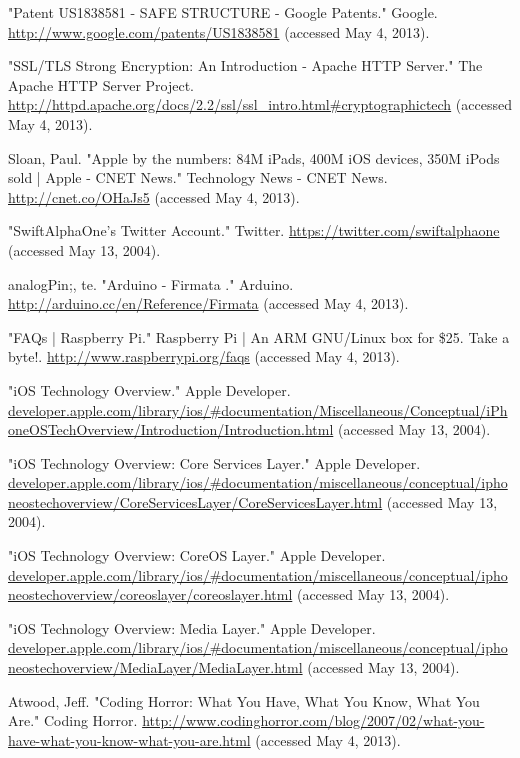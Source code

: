 \documentclass[10pt]{article}
\begin{document}
\begin{multicols}{2}
\begin{thebibliography}{99}
"Patent US1838581 - SAFE STRUCTURE - Google Patents." Google. \url{http://www.google.com/patents/US1838581} (accessed May 4, 2013).

"SSL/TLS Strong Encryption: An Introduction - Apache HTTP Server." The Apache HTTP Server Project. \url{http://httpd.apache.org/docs/2.2/ssl/ssl_intro.html#cryptographictech} (accessed May 4, 2013).

Sloan, Paul. "Apple by the numbers: 84M iPads, 400M iOS devices, 350M iPods sold | Apple - CNET News." Technology News - CNET News. \url{http://cnet.co/OHaJs5} (accessed May 4, 2013).

"SwiftAlphaOne's Twitter Account." Twitter. \url{https://twitter.com/swiftalphaone} (accessed May 13, 2004).

analogPin;, te. "Arduino - Firmata ." Arduino. \url{http://arduino.cc/en/Reference/Firmata} (accessed May 4, 2013).

"FAQs  | Raspberry Pi." Raspberry Pi | An ARM GNU/Linux box for \$25. Take a byte!. \url{http://www.raspberrypi.org/faqs} (accessed May 4, 2013).

"iOS Technology Overview." Apple Developer. \url{developer.apple.com/library/ios/#documentation/Miscellaneous/Conceptual/iPhoneOSTechOverview/Introduction/Introduction.html} (accessed May 13, 2004).

"iOS Technology Overview: Core Services Layer." Apple Developer. \url{developer.apple.com/library/ios/#documentation/miscellaneous/conceptual/iphoneostechoverview/CoreServicesLayer/CoreServicesLayer.html} (accessed May 13, 2004).

"iOS Technology Overview: CoreOS Layer." Apple Developer. \url{developer.apple.com/library/ios/#documentation/miscellaneous/conceptual/iphoneostechoverview/coreoslayer/coreoslayer.html} (accessed May 13, 2004).

"iOS Technology Overview: Media Layer." Apple Developer. \url{developer.apple.com/library/ios/#documentation/miscellaneous/conceptual/iphoneostechoverview/MediaLayer/MediaLayer.html} (accessed May 13, 2004).

Atwood, Jeff. "Coding Horror: What You Have, What You Know, What You Are." Coding Horror. \url{http://www.codinghorror.com/blog/2007/02/what-you-have-what-you-know-what-you-are.html} (accessed May 4, 2013).


\end{thebibliography}
\end{multicols}
\end{document}
